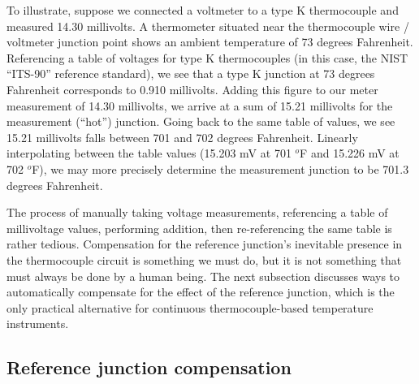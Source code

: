 To illustrate, suppose we connected a voltmeter to a type K thermocouple and measured 14.30 millivolts.  A thermometer situated near the thermocouple wire / voltmeter junction point shows an ambient temperature of 73 degrees Fahrenheit.  Referencing a table of voltages for type K thermocouples (in this case, the NIST ``ITS-90'' reference standard), we see that a type K junction at 73 degrees Fahrenheit corresponds to 0.910 millivolts.  Adding this figure to our meter measurement of 14.30 millivolts, we arrive at a sum of 15.21 millivolts for the measurement (``hot'') junction.  Going back to the same table of values, we see 15.21 millivolts falls between 701 and 702 degrees Fahrenheit.  Linearly interpolating between the table values (15.203 mV at 701 $^{o}$F and 15.226 mV at 702 $^{o}$F), we may more precisely determine the measurement junction to be 701.3 degrees Fahrenheit.    

\vskip 10pt

The process of manually taking voltage measurements, referencing a table of millivoltage values, performing addition, then re-referencing the same table is rather tedious.  Compensation for the reference junction's inevitable presence in the thermocouple circuit is something we must do, but it is not something that must always be done by a human being.  The next subsection discusses ways to automatically compensate for the effect of the reference junction, which is the only practical alternative for continuous thermocouple-based temperature instruments.






\filbreak
\subsection{Reference junction compensation}


